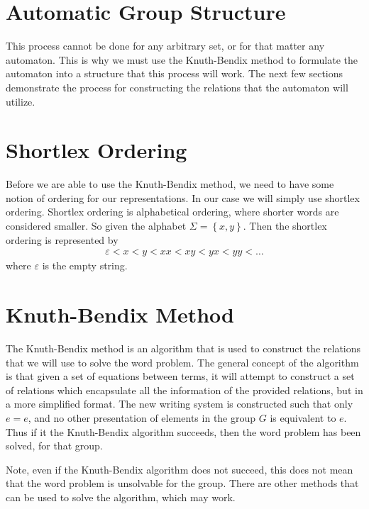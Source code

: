 \documentclass[10pt]{amsart}
\theoremstyle{definition}
\theoremstyle{remark}
\begin{document}
\section{Automatic Group Structure}%
\label{sec:automatic_group_structure}

This process cannot be done for any arbitrary set, or for that matter any
automaton. This is why we must use the Knuth-Bendix method to formulate the
automaton into a structure that this process will work. The next few sections
demonstrate the process for constructing the relations that the automaton will
utilize.

\section{Shortlex Ordering}%
\label{sec:shortlex_ordering}

Before we are able to use the Knuth-Bendix method, we need to have some notion
of ordering for our representations. In our case we will simply use shortlex
ordering. Shortlex ordering is alphabetical ordering, where shorter words are
considered smaller. So given the alphabet $\Sigma=\left\{x,y\right\}$. Then the
shortlex ordering is represented by
\begin{align*}
  \varepsilon<x<y<xx<xy<yx<yy<\ldots
\end{align*}
where $\varepsilon$ is the empty string.

\section{Knuth-Bendix Method}%
\label{sec:kunth_bendix_method}

The Knuth-Bendix method is an algorithm that is used to construct the relations
that we will use to solve the word problem. The general concept of the
algorithm is that given a set of equations between terms, it will attempt to
construct a set of relations which encapsulate all the information of the
provided relations, but in a more simplified format. The new writing system is
constructed such that only $e=e$, and no other presentation of elements in the
group $G$ is equivalent to $e$. Thus if it the Knuth-Bendix algorithm succeeds,
then the word problem has been solved, for that group.

Note, even if the Knuth-Bendix algorithm does not succeed, this does not mean
that the word problem is unsolvable for the group. There are other methods that
can be used to solve the algorithm, which may work.
\end{document}
